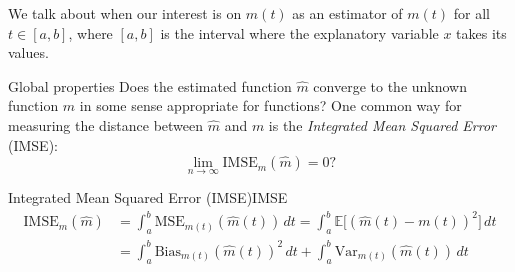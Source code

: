 We talk about  when our interest is on $\hat m(t)$
as an estimator of $m(t)$ for all $t \in [a, b]$, where $[a, b]$ is the
interval where the explanatory variable $x$ takes its values.

\begin{question}{Global properties}{}
    Does the estimated function $\hat m$ converge to the unknown function $m$
    in some sense appropriate for functions?
    \tcblower
    One common way for measuring the distance between $\hat m$ and $m$ is
    the \emph{Integrated Mean Squared Error} (IMSE):
    \begin{equation*}
        \lim_{n\to\infty} \text{IMSE}_{m}(\hat m) = 0?
    \end{equation*}
\end{question}

\begin{definition}{Integrated Mean Squared Error (IMSE)}{IMSE}
    \begin{align*}
        \text{IMSE}_{m}(\hat m) &= \int_a^b \text{MSE}_{m(t)}(\hat m(t)) \, dt
                = \int_a^b \mathds{E}\bigl[(\hat m(t) - m(t))^2\bigr] \, dt \\
                                &= \int_a^b \text{Bias}_{m(t)}(\hat m(t))^2 \, dt +
                                   \int_a^b \text{Var}_{m(t)}(\hat m(t)) \, dt
    \end{align*}
\end{definition}

